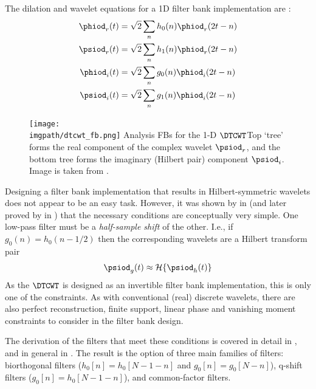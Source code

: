   The dilation and wavelet equations for a 1D filter bank implementation are
  \cite{selesnick_dual-tree_2005}:
  \begin{align}
    \phiod_r(t) & =  \sqrt{2} \sum_n h_0(n) \phiod_r(2t-n) \\
    \psiod_r(t) & =  \sqrt{2} \sum_n h_1(n) \phiod_r(2t-n) \\
    \phiod_i(t) & =  \sqrt{2} \sum_n g_0(n) \phiod_i(2t-n) \\
    \psiod_i(t) & =  \sqrt{2} \sum_n g_1(n) \phiod_i(2t-n)
  \end{align}

  \begin{figure}
    \centering
      \texttt{[image: \\imgpath/dtcwt\_fb.png]}
      \mycaption
      {Analysis FBs for the 1-D $\DTCWT$}{Top `tree' forms the real component of the
      complex wavelet $\psiod_r$, and the bottom tree forms the imaginary (Hilbert
      pair) component $\psiod_i$. Image is taken from
      \cite{kingsbury_image_1999}.}
      \label{fig:ch2:dtcwt_1d_fb}
  \end{figure}

  Designing a filter bank implementation that results in Hilbert-symmetric
  wavelets does not appear to be an easy task. However, it was shown
  by \citeauthor{kingsbury_image_1999} in \cite{kingsbury_image_1999} (and later proved by
  \citeauthor{selesnick_hilbert_2001} in \cite{selesnick_hilbert_2001}) that the
  necessary conditions are conceptually very simple. One low-pass filter must be
  a \emph{half-sample shift} of the other. I.e., if $g_0(n) = h_0(n-1/2)$ then
  the corresponding wavelets are a Hilbert transform pair
  \begin{equation}
    \psiod_g(t) \approx \mathcal{H}\{\psiod_h(t)\}
  \end{equation}
  As the $\DTCWT$ is designed as an invertible filter bank implementation, this
  is only one of the constraints. As with conventional (real) discrete wavelets,
  there are also perfect reconstruction, finite support, linear phase and
  vanishing moment constraints to consider in the filter bank design.

  The derivation of the filters that meet these conditions is covered in
  detail in \cite{kingsbury_complex_2001, kingsbury_design_2003}, and in
  general in \cite{selesnick_dual-tree_2005}. The result is the
  option of three main families of filters: biorthogonal filters ($h_0[n] =
  h_0[N-1-n]$ and $g_0[n] = g_0[N-n]$), q-shift filters ($g_0[n]
  = h_0[N-1-n]$), and common-factor filters.

